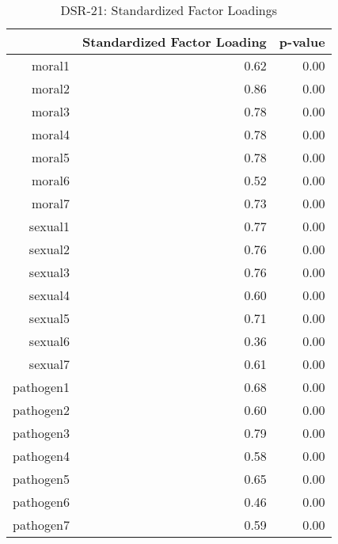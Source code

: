 \begin{table}[ht]
\centering
\caption{DSR-21: Standardized Factor Loadings} 
\label{tab:dsr_factor}
\begingroup\small
\begin{tabular}{rrr}
  \hline
 & Standardized Factor Loading & p-value \\ 
  \hline
moral1 & 0.62 & 0.00 \\ 
  moral2 & 0.86 & 0.00 \\ 
  moral3 & 0.78 & 0.00 \\ 
  moral4 & 0.78 & 0.00 \\ 
  moral5 & 0.78 & 0.00 \\ 
  moral6 & 0.52 & 0.00 \\ 
  moral7 & 0.73 & 0.00 \\ 
  sexual1 & 0.77 & 0.00 \\ 
  sexual2 & 0.76 & 0.00 \\ 
  sexual3 & 0.76 & 0.00 \\ 
  sexual4 & 0.60 & 0.00 \\ 
  sexual5 & 0.71 & 0.00 \\ 
  sexual6 & 0.36 & 0.00 \\ 
  sexual7 & 0.61 & 0.00 \\ 
  pathogen1 & 0.68 & 0.00 \\ 
  pathogen2 & 0.60 & 0.00 \\ 
  pathogen3 & 0.79 & 0.00 \\ 
  pathogen4 & 0.58 & 0.00 \\ 
  pathogen5 & 0.65 & 0.00 \\ 
  pathogen6 & 0.46 & 0.00 \\ 
  pathogen7 & 0.59 & 0.00 \\ 
   \hline
\end{tabular}
\endgroup
\end{table}
